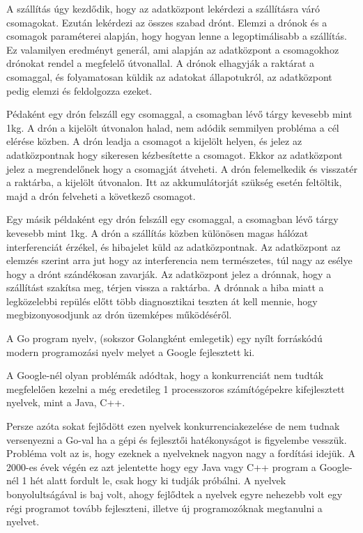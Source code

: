 
A szállítás úgy kezdődik, hogy az adatközpont lekérdezi a szállításra váró csomagokat. Ezután lekérdezi az összes szabad drónt.
Elemzi a drónok és a csomagok paraméterei alapján, hogy hogyan lenne a legoptimálisabb a szállítás. Ez valamilyen eredményt generál, ami
alapján az adatközpont a csomagokhoz drónokat rendel a megfelelő útvonallal. A drónok elhagyják a raktárat a csomaggal, és folyamatosan küldik az adatokat állapotukról,
az adatközpont pedig elemzi és feldolgozza ezeket.

Pédaként egy drón felszáll egy csomaggal, a csomagban lévő tárgy kevesebb mint 1kg. A drón a kijelölt útvonalon halad, nem adódik semmilyen probléma a cél
elérése közben. A drón leadja a csomagot a kijelölt helyen, és jelez az adatközpontnak hogy sikeresen kézbesítette a csomagot.
Ekkor az adatközpont jelez a megrendelőnek hogy a csomagját átveheti. A drón felemelkedik és visszatér a raktárba, a kijelölt útvonalon. Itt az akkumulátorját szükség esetén
feltöltik, majd a drón felveheti a következő csomagot.

Egy másik példaként egy drón felszáll egy csomaggal, a csomagban lévő tárgy kevesebb mint 1kg. A drón a szállítás közben különösen magas hálózat interferenciát érzékel,
és hibajelet küld az adatközpontnak. Az adatközpont az elemzés szerint arra jut hogy az interferencia nem természetes,
túl nagy az esélye hogy a drónt szándékosan zavarják. Az adatközpont jelez a drónnak, hogy a szállítást szakítsa meg, térjen vissza a raktárba.
A drónnak a hiba miatt a legközelebbi repülés előtt több diagnosztikai teszten át kell mennie, hogy megbizonyosodjunk az drón üzemképes működéséről.


A Go program nyelv, (sokszor Golangként emlegetik) egy nyílt forráskódú modern programozási nyelv melyet a Google fejlesztett ki.

A Google-nél olyan problémák adódtak, hogy a konkurrenciát nem tudták megfelelően kezelni a még eredetileg
1 processzoros számítógépekre kifejlesztett nyelvek, mint a Java, C++.

Persze azóta sokat fejlődött ezen nyelvek konkurrenciakezelése de nem tudnak versenyezni a Go-val
ha a gépi és fejlesztői hatékonyságot is figyelembe vesszük.
Probléma volt az is, hogy ezeknek a nyelveknek nagyon nagy a fordítási idejük. A 2000-es évek végén ez azt jelentette
hogy egy Java vagy C++ program a Google-nél 1 hét alatt fordult le, csak hogy ki tudják próbálni.
A nyelvek bonyolultságával is baj volt, ahogy fejlődtek a nyelvek egyre nehezebb volt egy régi programot tovább fejleszteni,
illetve új programozóknak megtanulni a nyelvet.

